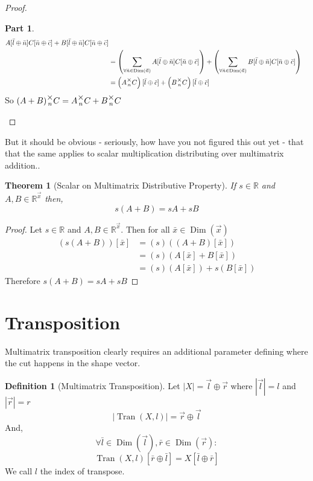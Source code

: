\documentclass[12pt]{book}
\theoremstyle{plain}
\newtheorem{theorem}{Theorem}[chapter]
\theoremstyle{definition}
\newtheorem{definition}{Definition}[chapter]
\theoremstyle{ppart}
\newtheorem{ppart}{Part}
\theoremstyle{case}
\theoremstyle{solution}
\DeclareMathOperator{\Dim}{Dim}
\DeclareMathOperator{\Tran}{Tran}
\newcommand{\mmult}[1]{\text{\raisebox{1ex}{$\underset{#1}{\times}$}}}
\begin{document}
\begin{landscape}
\begin{proof}
\begin{ppart}
\begin{align*}
    A[\bar{l} \oplus \bar{n}]C[\bar{n} \oplus \bar{c}]
    +B[\bar{l} \oplus \bar{n}]C[\bar{n} \oplus \bar{c}] \\
 &= \left(\sum_{\forall \bar{n} \in \Dim(\vec{n})}
    A[\bar{l} \oplus \bar{n}]C[\bar{n} \oplus \bar{c}]\right)
    +
    \left(\sum_{\forall \bar{n} \in \Dim(\vec{n})}
    B[\bar{l} \oplus \bar{n}]C[\bar{n} \oplus \bar{c}]\right) \\
 &= \left(A \mmult{n} C\right)[\bar{l} \oplus \bar{c}]
    +\left(B \mmult{n} C\right)[\bar{l} \oplus \bar{c}]
\end{align*}
So $(A+B) \mmult{n} C = A \mmult{n} C + B \mmult{n} C$ 
\end{ppart}
\end{proof}
\end{landscape}

But it should be obvious - seriously, how have you not figured this out yet -
that that the same applies to scalar  multiplication distributing over multimatrix
addition..
\begin{theorem}[Scalar on Multimatrix Distributive Property]
If $s \in \mathbb{R}$ and $A, B \in \mathbb{R}^{\vec{x}}$ then,
\[ s(A + B) = sA + sB \]
\end{theorem}
\begin{proof}
Let $s \in \mathbb{R}$ and $A, B \in \mathbb{R}^{\vec{x}}$.
Then for all $\bar{x} \in \Dim(\vec{x})$
\begin{align*}
(s(A+B))[\bar{x}]
&= (s)((A+B)[\bar{x}]) \\
&= (s)(A[\bar{x}] + B[\bar{x}]) \\
&= (s)(A[\bar{x}]) + s(B[\bar{x}])
\end{align*}
Therefore $s(A+B) = sA + sB$
\end{proof}

\section{Transposition}

Multimatrix transposition clearly requires an additional parameter defining where
the cut happens in the shape vector.

\begin{definition}[Multimatrix Transposition]
\label{tran_def}
Let $|X| = \vec{l} \oplus \vec{r}$ where $|\vec{l}| = l$ and $|\vec{r}| = r$
\[ |\Tran(X, l)| = \vec{r} \oplus \vec{l} \]
And,
\[ \forall \bar{l} \in \Dim(\vec{l}), \bar{r} \in \Dim(\vec{r}) : \]
\[ \Tran(X, l)[\bar{r} \oplus \bar{l}] = X[\bar{l} \oplus \bar{r}] \]
We call $l$ the index of transpose.
\end{definition}
\end{document}
